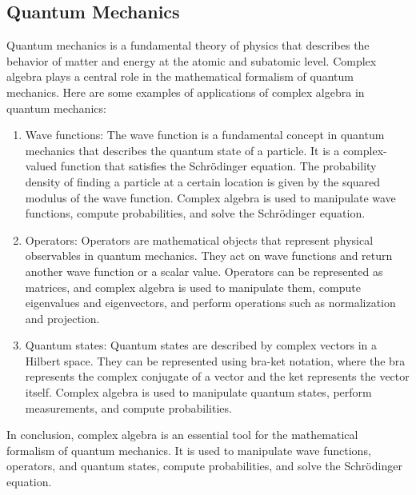 \documentclass{article}
\begin{document}
\subsection{Quantum Mechanics}
Quantum mechanics is a fundamental theory of physics that describes the
behavior of matter and energy at the atomic and subatomic level. Complex
algebra plays a central role in the mathematical formalism of quantum
mechanics. Here are some examples of applications of complex algebra in quantum
mechanics:
\begin{enumerate}
\item Wave functions: The wave function is a fundamental concept in quantum mechanics that describes the quantum state of a particle. It is a complex-valued function that satisfies the Schrödinger equation. The probability density of finding a particle at a certain location is given by the squared modulus of the wave function. Complex algebra is used to manipulate wave functions, compute probabilities, and solve the Schrödinger equation.
\item Operators: Operators are mathematical objects that represent physical observables in quantum mechanics. They act on wave functions and return another wave function or a scalar value. Operators can be represented as matrices, and complex algebra is used to manipulate them, compute eigenvalues and eigenvectors, and perform operations such as normalization and projection.
\item Quantum states: Quantum states are described by complex vectors in a Hilbert space. They can be represented using bra-ket notation, where the bra represents the complex conjugate of a vector and the ket represents the vector itself. Complex algebra is used to manipulate quantum states, perform measurements, and compute probabilities.
\end{enumerate}
In conclusion, complex algebra is an essential tool for the mathematical formalism of quantum mechanics. It is used to manipulate wave functions, operators, and quantum states, compute probabilities, and solve the Schrödinger equation.
\end{document}
